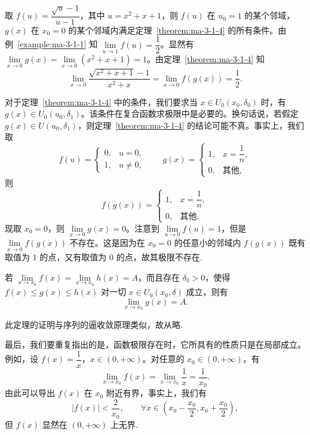 \begin{solve}
取 $f(u)=\dfrac{\sqrt{u}-1}{u-1}$，其中 $u=x^2+x+1$，则 $f(u)$ 在 $u_0=1$ 的某个邻域，$g(x)$ 在 $x_0=0$ 的某个邻域内满足定理~\ref{theorem:ma-3-1-4} 的所有条件。由例~\ref{example:ma-3-1-1} 知 $\lim\limits_{u\to1}f(u)=\dfrac12$。显然有 $\lim\limits_{x\to0}g(x)=\lim\limits_{x\to0}(x^2+x+1)=1$。由定理~\ref{theorem:ma-3-1-4} 知
\[
  \lim_{x\to0}\frac{\sqrt{x^2+x+1}-1}{x^2+x}
  =\lim_{x\to0}f(g(x))=\frac12.
\]

对于定理~\ref{theorem:ma-3-1-4} 中的条件，我们要求当 $x\in U_0(x_0,\delta_0)$ 时，有 $g(x)\in U_0(u_0,\delta_1)$。该条件在复合函数求极限中是必要的。换句话说，若假定 $g(x)\in U(u_0,\delta_1)$，则定理~\ref{theorem:ma-3-1-4} 的结论可能不真。事实上，我们取
\[
  f(u)=
  \begin{cases}
    0, & u=0,\\
    1, & u\ne0,
  \end{cases}
  \qquad
  g(x)=
  \begin{cases}
    1, & x=\dfrac1n,\\
    0, & \text{其他},
  \end{cases}
\]
则
\[
  f(g(x))=
  \begin{cases}
    1, & x=\dfrac1n,\\
    0, & \text{其他}.
  \end{cases}
\]
现取 $x_0=0$，则 $\lim\limits_{x\to0}g(x)=0$。注意到 $\lim\limits_{u\to0}f(u)=1$，但是 $\lim\limits_{x\to0}f(g(x))$ 不存在。这是因为在 $x_0=0$ 的任意小的邻域内 $f(g(x))$ 既有取值为 $1$ 的点，又有取值为 $0$ 的点，故其极限不存在.
\end{solve}


\begin{theorem}[{夹逼收敛原理}]\label{theorem:ma-3-1-5}
若 $\lim\limits_{x\to x_0}f(x)=\lim\limits_{x\to x_0}h(x)=A$，而且存在 $\delta_0>0$，使得 $f(x)\leqslant g(x)\leqslant h(x)$ 对一切 $x\in U_0(x_0,\delta)$ 成立，则有
\[
  \lim_{x\to x_0}g(x)=A.
\]
\end{theorem}

此定理的证明与序列的逼收敛原理类似，故从略.

最后，我们要重复指出的是，函数极限存在时，它所具有的性质只是在局部成立。例如，设 $f(x)=\dfrac1x$，$x\in(0,+\infty)$。对任意的 $x_0\in(0,+\infty)$，有
\[
  \lim_{x\to x_0}f(x)=\lim_{x\to x_0}\frac1x=\frac1{x_0}.
\]
由此可以导出 $f(x)$ 在 $x_0$ 附近有界，事实上，我们有
\[
  |f(x)|<\frac{2}{x_0},\qquad \forall x\in\left(x_0-\frac{x_0}{2},x_0+\frac{x_0}{2}\right),
\]
但 $f(x)$ 显然在 $(0,+\infty)$ 上无界.

